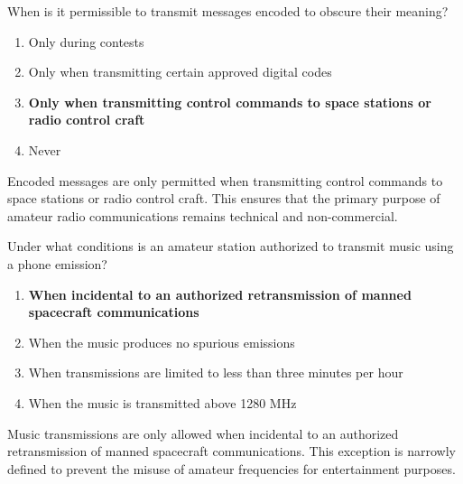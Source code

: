 
\begin{tcolorbox}[colback=gray!10!white,colframe=black!75!black,title={T1D03}]
When is it permissible to transmit messages encoded to obscure their meaning?
\begin{enumerate}[label=\Alph*),noitemsep]
    \item Only during contests
    \item Only when transmitting certain approved digital codes
    \item \textbf{Only when transmitting control commands to space stations or radio control craft}
    \item Never
\end{enumerate}
\end{tcolorbox}
Encoded messages are only permitted when transmitting control commands to space stations or radio control craft. This ensures that the primary purpose of amateur radio communications remains technical and non-commercial.


\begin{tcolorbox}[colback=gray!10!white,colframe=black!75!black,title={T1D04}]
Under what conditions is an amateur station authorized to transmit music using a phone emission?
\begin{enumerate}[label=\Alph*),noitemsep]
    \item \textbf{When incidental to an authorized retransmission of manned spacecraft communications}
    \item When the music produces no spurious emissions
    \item When transmissions are limited to less than three minutes per hour
    \item When the music is transmitted above 1280 MHz
\end{enumerate}
\end{tcolorbox}
Music transmissions are only allowed when incidental to an authorized retransmission of manned spacecraft communications. This exception is narrowly defined to prevent the misuse of amateur frequencies for entertainment purposes.


